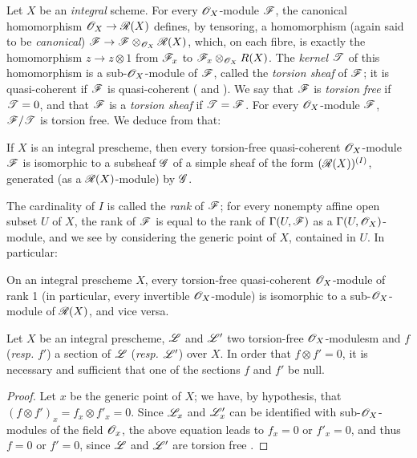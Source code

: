 \begin{env}[7.4.1]
\label{1.7.4.1}
Let $X$ be an \emph{integral} scheme.
For every $\mathscr{O}_X$-module $\mathscr{F}$, the canonical homomorphism $\mathscr{O}_X\to\mathscr{R}(X)$ defines, by tensoring, a homomorphism (again said to be \emph{canonical}) $\mathscr{F}\to\mathscr{F}\otimes_{\mathscr{O}_X}\mathscr{R}(X)$, which, on each fibre, is exactly the homomorphism $z\to z\otimes1$ from $\mathscr{F}_x$ to $\mathscr{F}_x\otimes_{\mathscr{O}_X}R(X)$.
The \emph{kernel $\mathscr{T}$} of this homomorphism is a sub-$\mathscr{O}_X$-module of $\mathscr{F}$, called the \emph{torsion sheaf} of $\mathscr{F}$; it is quasi-coherent if $\mathscr{F}$ is quasi-coherent ( and ).
We say that $\mathscr{F}$ is \emph{torsion free} if $\mathscr{T}=0$, and that $\mathscr{F}$ is a \emph{torsion sheaf} if $\mathscr{T}=\mathscr{F}$.
For every $\mathscr{O}_X$-module $\mathscr{F}$, $\mathscr{F}/\mathscr{T}$ is torsion free.
We deduce from  that:
\end{env}

\begin{prop}[7.4.2]
\label{1.7.4.2}
If $X$ is an integral prescheme, then every torsion-free quasi-coherent $\mathscr{O}_X$-module $\mathscr{F}$ is isomorphic to a subsheaf $\mathscr{G}$ of a simple sheaf of the form $(\mathscr{R}(X))^{(I)}$, generated (as a $\mathscr{R}(X)$-module) by $\mathscr{G}$.
\end{prop}

The cardinality of $I$ is called the \emph{rank} of $\mathscr{F}$; for every nonempty affine open subset $U$ of $X$, the rank of $\mathscr{F}$ is equal to the rank of $\Gamma(U,\mathscr{F})$ as a $\Gamma(U,\mathscr{O}_X)$-module, and we see by considering the generic point of $X$, contained in $U$.
In particular:

\begin{cor}[7.4.3]
\label{1.7.4.3}
On an integral prescheme $X$, every torsion-free quasi-coherent $\mathscr{O}_X$-module of rank 1 (in particular, every invertible $\mathscr{O}_X$-module) is isomorphic to a sub-$\mathscr{O}_X$-module of $\mathscr{R}(X)$, and vice versa.
\end{cor}

\begin{cor}[7.4.4]
\label{1.7.4.4}
Let $X$ be an integral prescheme, $\mathscr{L}$ and $\mathscr{L}'$ two torsion-free $\mathscr{O}_X$-modulesm and $f$ (\emph{resp.} $f'$) a section of $\mathscr{L}$ (\emph{resp.} $\mathscr{L}'$) over $X$.
In order that $f\otimes f'=0$, it is necessary and sufficient that one of the sections $f$ and $f'$ be null.
\end{cor}

\begin{proof}
\label{proof-1.7.4.4}
Let $x$ be the generic point of $X$; we have, by hypothesis, that $(f\otimes f')_x = f_x\otimes f'_x = 0$.
Since $\mathscr{L}_x$ and $\mathscr{L}'_x$ can be identified with sub-$\mathscr{O}_X$-modules of the field $\mathscr{O}_x$, the above equation leads to $f_x=0$ or $f'_x=0$, and thus $f=0$ or $f'=0$, since $\mathscr{L}$ and $\mathscr{L}'$ are torsion free .
\end{proof}

